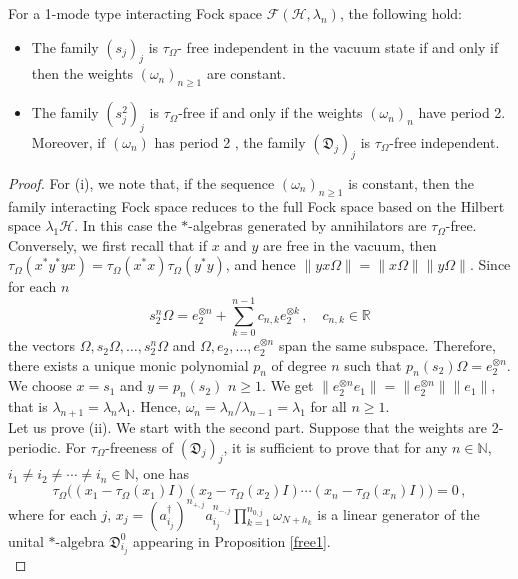 \documentclass[10pt,a4paper]{amsart}
\newcommand{\cf}{cf.\ }
\def\Om{\Omega}
\def\bn{{\mathbb N}}
\def\br{{\mathbb R}}
\def\cf{{\mathcal F}}
\def\ch{{\mathcal H}}
\def\gd{{\mathfrak D}}
\def\l{\lambda} \def\L{\Lambda}
\def\om{\omega} \def\Om{\Omega}
\def\t{\tau}
\begin{document}
\begin{prop}\label{2perfree}
For a 1-mode type interacting Fock space $\cf(\ch,\l_n)$, the following hold:
\begin{itemize}
\item[(i)] The family $(s_j)_j$ is $\t_\Om$- free independent in the vacuum state if and only if then the weights $(\omega_n)_{n\geq 1}$ are constant.
\item[(ii)]  The family $(s_j^2)_j$ is $\t_\Om$-free if and only if the weights $(\om_n)_n$ have period 2. Moreover, if $(\om_{n})$ has period 2 , the family $(\gd_j)_j$ is $\t_\Om$-free independent.
\end{itemize}
\end{prop}

\begin{proof}
  For (i), we note that, if the sequence $(\omega_n)_{n\geq 1}$ is constant, then
  the family interacting Fock space reduces to the full Fock space based on the Hilbert space $\lambda_1\ch$. In this case the $*$-algebras generated by annihilators are $\t_\Om$-free.\\
Conversely, we first recall that if $x$ and $y$ are free in the vacuum, then
  $\tau_\Om(x^*y^*yx)=\tau_\Om(x^*x)\tau_\Om(y^*y)$, and hence $\|yx\Omega\|=\|x\Omega\|\|y\Omega\|$. Since for each $n$
$$
s_2^n\Om=e_2^{\otimes n}
+\sum_{k=0}^{n-1}c_{n,k}e_2^{\otimes k}\,, \quad c_{n,k}\in\br
$$
the vectors $\Om,s_2\Om,\ldots,s_2^n\Om$ and $\Om,e_2,\ldots,e_2^{\otimes n}$
span the same subspace. Therefore, there exists a unique monic polynomial
$p_n$ of degree $n$ such that $p_n(s_2)\Om=e_2^{\otimes n}$. We choose $x=s_1$ and $y=p_n(s_2)$ %
  $n\geq 1$. We get $\|e_{2}^{\otimes n}e_1\|=\|e_{2}^{\otimes n}\|\|e_1\|$, that is $\lambda_{n+1}=\lambda_n\lambda_1$. Hence, $\omega_n=\lambda_n/\lambda_{n-1}=\lambda_1$ for all $n\geq 1$.\\
Let us prove (ii). We start with the second part. Suppose that the weights are 2-periodic. For $\t_\Om$-freeness of $(\gd_j)_j$, it is sufficient to prove that for any $n\in\bn$, $i_1\neq i_2\neq \cdots\neq i_n\in\bn$, one has
\begin{equation}\label{freen}
\t_\Om\big((x_1-\t_\Om(x_1)I)(x_2-\t_\Om(x_2)I)\cdots (x_n-\t_\Om(x_n)I)\big)=0\,,
\end{equation}
where for each $j$, $x_j=(a_{i_j}^\dag)^{n_{+,j}}a_{i_j}^{n_{-,j}}\prod_{k=1}^{n_{0,j}}\om_{N+h_k}$ is a linear generator
of the unital $*$-algebra $\gd^0_{i_j}$ appearing in Proposition \ref{free1}. \\

\end{proof}
\end{document}
